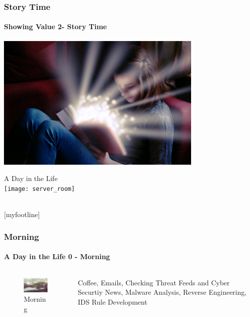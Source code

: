 \documentclass[aspectratio=169]{beamer}
\begin{document}
\begin{frame}
  \frametitle{Story Time}
  \framesubtitle{Showing Value 2- Story Time}
  \begin{center}
    \includegraphics[width=10cm,keepaspectratio]{story_time}
  \end{center}
\end{frame}


\begin{frame}[t]
  \begin{center}
    \begingroup
    \fontsize{20pt}{20pt}\selectfont
    A Day in the Life \\
    \endgroup
    \bigskip
    \texttt{[image: server\_room]} \\
    \bigskip
    \inserttitle \\
  \end{center}
\end{frame}

[myfootline]

\begin{frame}
  \frametitle{Morning}
  \framesubtitle{A Day in the Life 0 - Morning}
  \begin{columns}[onlytextwidth]
    \begin{column}{.30\textwidth}
      \begin{figure}
        \includegraphics[width=5.5cm,keepaspectratio]{morning}
        \caption{Morning}
      \end{figure}
    \end{column}
    \hfill
    \begin{column}{.60\textwidth}
        \begin{tcolorbox}[title=social\_media.log,colback=gray]
          Coffee, Emails, Checking Threat Feeds and Cyber Securtiy News, Malware Analysis, Reverse Engineering, IDS Rule Development
        \end{tcolorbox}
    \end{column}
  \end{columns}
\end{frame}
\end{document}
